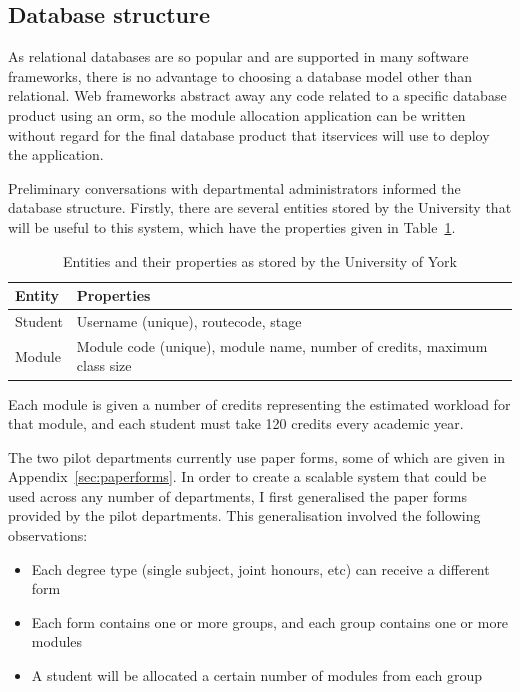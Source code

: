 
\subsection{Database structure}
\label{developmentdatabasestructure}

As relational databases are so popular and are supported in many software
frameworks, there is no advantage to choosing a database model other than
relational. Web frameworks abstract away any code related to a specific
database product using an \gls{orm}, so the module allocation application can
be written without regard for the final database product that \gls{itservices}
will use to deploy the application.

Preliminary conversations with departmental administrators informed the
database structure. Firstly, there are several entities stored by the
University that will be useful to this system, which have the properties given
in Table~\ref{development_database_uni_entities}.

\begin{table}
  \begin{center}
    \begin{tabular}{ | l | l | }
      \hline
      \textbf{Entity} & \textbf{Properties} \\
      \hline
      Student    & Username (unique), \gls{routecode}, \gls{stage} \\
      Module     & Module code (unique), module name, number of credits, maximum class size \\
      \hline
    \end{tabular}    
  \end{center}
  \caption{Entities and their properties as stored by the University of York}
  \label{development_database_uni_entities}
\end{table}

Each module is given a number of credits representing the estimated workload
for that module, and each student must take 120 credits every academic year.

The two pilot departments currently use paper forms, some of which are given
in Appendix~\ref{sec:paperforms}. In order to create a scalable system that
could be used across any number of departments, I first generalised the paper
forms provided by the pilot departments. This generalisation involved the
following observations:

\begin{itemize}
  \item Each degree type (single subject, joint honours, etc) can receive a different form
  \item Each form contains one or more groups, and each group contains one or more modules
  \item A student will be allocated a certain number of modules from each group
\end{itemize}

